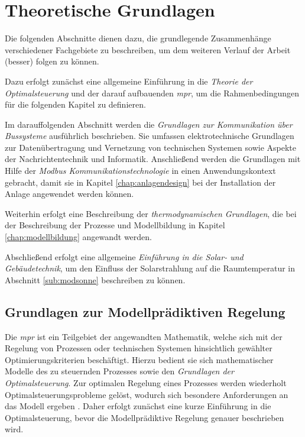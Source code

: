 \renewcommand{\chapterheadstartvskip}{\vspace*{2cm}}

\chapter{Theoretische Grundlagen}
\label{chap:theoretischegrundlagen}

Die folgenden Abschnitte dienen dazu, die grundlegende Zusammenhänge verschiedener Fachgebiete zu beschreiben, um dem weiteren Verlauf der Arbeit (besser) folgen zu können.

 Dazu erfolgt zunächst eine allgemeine Einführung in die \textit{Theorie der Optimalsteuerung} und der darauf aufbauenden \textit{\acrlong{mpr}}, um die Rahmenbedingungen für die folgenden Kapitel zu definieren. 
 
Im darauffolgenden Abschnitt werden die \textit{Grundlagen zur Kommunikation über Bussysteme} ausführlich beschrieben. Sie umfassen elektrotechnische Grundlagen zur Datenübertragung und Vernetzung von technischen Systemen sowie Aspekte der Nachrichtentechnik und Informatik. Anschließend werden die Grundlagen mit Hilfe der \textit{Modbus Kommunikationstechnologie} in einen Anwendungskontext gebracht, damit sie in Kapitel \ref{chap:anlagendesign} bei der Installation der Anlage angewendet werden können.

Weiterhin erfolgt eine Beschreibung der \textit{thermodynamischen Grundlagen}, die bei der Beschreibung der Prozesse und Modellbildung in Kapitel \ref{chap:modellbildung} angewandt werden. 

Abschließend erfolgt eine allgemeine \textit{Einführung in die Solar- und Gebäudetechnik}, um den Einfluss der Solarstrahlung auf die Raumtemperatur in Abschnitt \ref{sub:modsonne} beschreiben zu können.

\section{Grundlagen zur Modellprädiktiven Regelung}
\label{sec:mpc}

Die \textit{\acrlong{mpr}} ist ein Teilgebiet der angewandten Mathematik, welche sich mit der Regelung von Prozessen oder technischen Systemen hinsichtlich gewählter Optimierungskriterien beschäftigt. Hierzu bedient sie sich mathematischer Modelle des zu steuernden Prozesses sowie den \textit{Grundlagen der Optimalsteuerung}. Zur optimalen Regelung eines Prozesses werden wiederholt Optimalsteuerungsprobleme gelöst, wodurch sich besondere Anforderungen an das Modell ergeben \cite[S.~10]{di14}. Daher erfolgt zunächst eine kurze Einführung in die Optimalsteuerung, bevor die Modellprädiktive Regelung genauer beschrieben wird.

